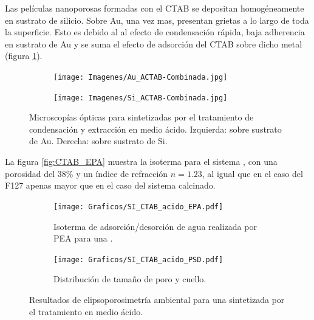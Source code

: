 {		Las películas nanoporosas formadas con el CTAB se depositan homogéneamente en sustrato de silicio. Sobre Au, una vez mas, presentan grietas a lo largo de toda la superficie. Esto es debido al al efecto de condensación rápida, baja adherencia en sustrato de Au y se suma el efecto de adsorción del CTAB sobre dicho metal (figura \ref{fig:Microscopia_CTAB_acido}). 

		\begin{figure}[!th]
 	   	    \begin{subfigure}[t]{0.49\textwidth}
	       	\texttt{[image: Imagenes/Au\_ACTAB-Combinada.jpg]}
	   		\end{subfigure}
	   		\begin{subfigure}[t]{0.49\textwidth}
	   	    \texttt{[image: Imagenes/Si\_ACTAB-Combinada.jpg]}
	   		\end{subfigure}
			 \caption[Microscopía óptica \pdmC tratamiento en medio ácido.]{Microscopías ópticas para \pdmC\space sintetizadas por el tratamiento de condensación y extracción en medio ácido. Izquierda: sobre sustrato de Au. Derecha: sobre sustrato de Si.}
			 \label{fig:Microscopia_CTAB_acido}	
		     \end{figure}	

		La figura \ref{fig:CTAB_EPA} muestra la isoterma para el sistema \pdmC, con una porosidad del 38\% y un índice de refracción $n=1.23$, al igual que en el caso del F127 apenas mayor que en el caso del sistema calcinado.

		\pagebreak

		\begin{figure}[!ht]
		  	\begin{subfigure}[t]{0.495\textwidth}
		  	\texttt{[image: Graficos/SI\_CTAB\_acido\_EPA.pdf]}
			\caption[Elipsoporsimetría \pdmC\space tratamiento ácido.]{Isoterma de adsorción/desorción de agua realizada por PEA para una \pdmC.}
			\label{fig:CTAB_acido_EPA}
			\end{subfigure}
			\begin{subfigure}[t]{0.495\textwidth}
		  	\texttt{[image: Graficos/SI\_CTAB\_acido\_PSD.pdf]}
			\caption{Distribución de tamaño de poro y cuello.\\ }
			\label{fig:CTAB_acido_PSD}
			\end{subfigure}
			\caption[Elipsoporosimetría \pdmC\space tratamiento ácido.]{Resultados de elipsoporosimetría ambiental para una \pdmC\space sintetizada por el tratamiento en medio ácido.}
			\end{figure}

}

